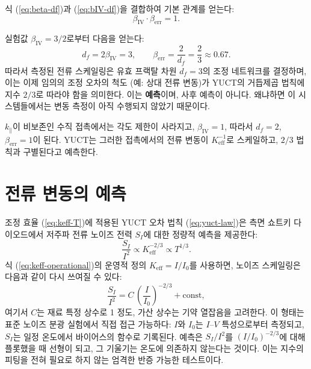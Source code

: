 \documentclass[12pt,a4paper]{article}
\newcommand{\Keff}{K_{\mathrm{eff}}}
\theoremstyle{remark}
\begin{document}
	식 (\ref{eq:beta-df})과 (\ref{eq:bIV-df})을 결합하여 기본 관계를 얻는다:
	\begin{equation}
		\boxed{\beta_{\mathrm{IV}} \cdot \beta_{\mathrm{err}} = 1}.
		\label{eq:relation}
	\end{equation}
	
	실험값 $\beta_{\mathrm{IV}} = 3/2$로부터 다음을 얻는다:
	\begin{equation}
		d_f = 2\beta_{\mathrm{IV}} = 3, \qquad
		\beta_{\mathrm{err}} = \frac{2}{d_f} = \frac{2}{3} \approx 0.67.
	\end{equation}
	따라서 측정된 전류 스케일링은 유효 프랙탈 차원 $d_f = 3$의 조정 네트워크를
	결정하며, 이는 이제 임의의 조정 오차의 척도 (예: 상대 전류 변동)가
	YUCT의 거듭제곱 법칙에 지수 $2/3$로 따라야 함을 의미한다. 이는 \textbf{예측}이며,
	사후 예측이 아니다. 왜냐하면 이 시스템들에서는 변동 측정이 아직 수행되지
	않았기 때문이다.
	
	$k_\parallel$이 비보존인 수직 접촉에서는 각도 제한이 사라지고,
	$\beta_{\mathrm{IV}} = 1$, 따라서 $d_f = 2$, $\beta_{\mathrm{err}} = 1$이 된다.
	YUCT는 그러한 접촉에서의 전류 변동이 $\Keff^{-1}$로 스케일하고,
	$2/3$ 법칙과 구별된다고 예측한다.
	
	\section{전류 변동의 예측}
	\label{sec:predictions}
	조정 효율 (\ref{eq:keff-T})에 적용된 YUCT 오차 법칙 (\ref{eq:yuct-law})은
	측면 쇼트키 다이오드에서 저주파 전류 노이즈 전력 $S_I$에 대한
	정량적 예측을 제공한다:
	\begin{equation}
		\frac{S_I}{I^2} \propto \Keff^{-2/3} \propto T^{1/3}.
		\label{eq:noise-pred}
	\end{equation}
	식 (\ref{eq:keff-operational})의 운영적 정의 $\Keff = I/I_0$를 사용하면,
	노이즈 스케일링은 다음과 같이 다시 쓰여질 수 있다:
	\begin{equation}
		\frac{S_I}{I^2} = C \, \left(\frac{I}{I_0}\right)^{-2/3} + \text{const},
		\label{eq:noise-operational}
	\end{equation}
	여기서 $C$는 재료 특정 상수로 1 정도, 가산 상수는 기약 열잡음을 고려한다.
	이 형태는 표준 노이즈 분광 실험에서 직접 접근 가능하다:
	$I$와 $I_0$는 $I$--$V$ 특성으로부터 측정되고, $S_I$는 일정 온도에서
	바이어스의 함수로 기록된다. 예측은 $S_I/I^2$를 $(I/I_0)^{-2/3}$에 대해
	플롯했을 때 선형이 되고, 그 기울기는 온도에 의존하지 않는다는 것이다.
	이는 지수의 피팅을 전혀 필요로 하지 않는 엄격한 반증 가능한 테스트이다.
	
\end{document}
